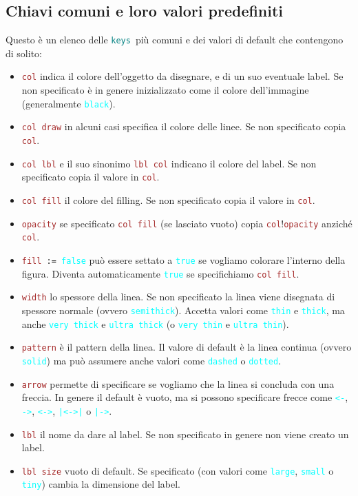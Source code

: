 \documentclass[italian, a4paper]{article}
\newcommand{\ttt}[1]{\texttt{#1}}
\newcommand{\cyan}[1]{\textcolor{cyan}{#1}}
\newcommand{\keys}{\textcolor{teal}{\ttt{keys}}}
\newcommand{\key}[1]{\textcolor{brown}{\ttt{#1}}}
\newcommand{\keyval}[1]{\cyan{\ttt{#1}}}
\begin{document}
\subsection{Chiavi comuni e loro valori predefiniti}\label{keysec}
Questo è un elenco delle \keys\ più comuni e dei valori di default che contengono di solito:
\begin{itemize}
\item \key{col} indica il colore dell'oggetto da disegnare, e di un suo eventuale label. Se non specificato è in genere inizializzato come il colore dell'immagine (generalmente \keyval{black}).
\item \key{col draw} in alcuni casi specifica il colore delle linee. Se non specificato copia \key{col}.
\item \key{col lbl} e il suo sinonimo \key{lbl col} indicano il colore del label. Se non specificato copia il valore in \key{col}.
\item \key{col fill} il colore del filling. Se non specificato copia il valore in \key{col}.
\item \key{opacity} se specificato \key{col fill} (se lasciato vuoto) copia \key{col}!\key{opacity} anziché \key{col}.
\item \ttt{\key{fill} := \keyval{false}} può essere settato a \keyval{true} se vogliamo colorare l'interno della figura. Diventa automaticamente \keyval{true} se specifichiamo \key{col fill}.
\item \key{width} lo spessore della linea. Se non specificato la linea viene disegnata di spessore normale (ovvero \keyval{semithick}). Accetta valori come \keyval{thin} e \keyval{thick}, ma anche \keyval{very thick} e \keyval{ultra thick} (o \keyval{very thin} e \keyval{ultra thin}).
\item \key{pattern} è il pattern della linea. Il valore di default è la linea continua (ovvero \keyval{solid}) ma può assumere anche valori come \keyval{dashed} o \keyval{dotted}.
\item \key{arrow} permette di specificare se vogliamo che la linea si concluda con una freccia. In genere il default è vuoto, ma si possono specificare frecce come \keyval{<-}, \keyval{->}, \keyval{<->}, \keyval{|<->|} o \keyval{|->}.
\item \key{lbl} il nome da dare al label. Se non specificato in genere non viene creato un label.
\item \key{lbl size} vuoto di default. Se specificato (con valori come \keyval{large}, \keyval{small} o \keyval{tiny}) cambia la dimensione del label.

\end{itemize}
\end{document}

